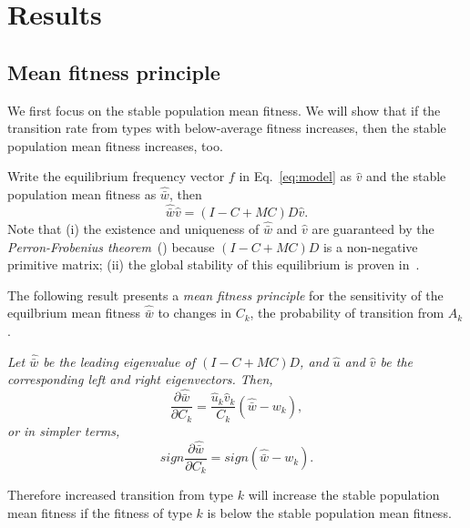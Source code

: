 \documentclass[9pt, a4paper, twocolumn]{extarticle}
\begin{document}
\section*{Results}

\subsection*{Mean fitness principle}

We first focus on the stable population mean fitness.
We will show that if the transition rate from types with below-average fitness increases, then the stable population mean fitness increases, too.


Write the equilibrium  frequency vector $f$ in Eq.~\ref{eq:model} as $\hat v$ and the stable population mean fitness as $\hat{\bar w}$, then
\begin{equation}\label{eq:model_equilibrium}
\hat{\bar w} \hat v = (I-C+MC)D \hat v.
\end{equation}
Note that (i) the existence and uniqueness of $\hat{\bar w}$ and $\hat v$ are guaranteed by the \emph{Perron-Frobenius theorem}~(\cite{Otto2007}) because $(I-C+MC)D$ is a non-negative primitive matrix; 
(ii) the global stability of this equilibrium is proven in~.

The following result presents a \emph{mean fitness principle} for the
sensitivity of the equilbrium mean fitness $\hat{\bar w}$ to changes
in $C_k$, the probability of transition from $A_k$.
\medskip

{\sl Let $\hat{\bar w}$ be the leading eigenvalue of $(I-C+MC)D$,
and $\hat u$ and $\hat v$ be the corresponding left and right eigenvectors.
Then,
\begin{equation}\label{mfp}
\frac{\partial \hat{\bar w}}{\partial C_k} = 
\frac{\hat u_k \hat v_k}{C_k} (\hat{\bar w} - w_k),
\end{equation}
or in simpler terms,
\begin{equation}\label{mfp_sign}
sign\frac{\partial \hat{\bar w}}{\partial C_k} = 
sign(\hat{\bar w} - w_k).
\end{equation}

Therefore increased transition from type $k$ will increase the stable population mean fitness if the fitness of type $k$ is below the stable population mean fitness.}
\end{document}
